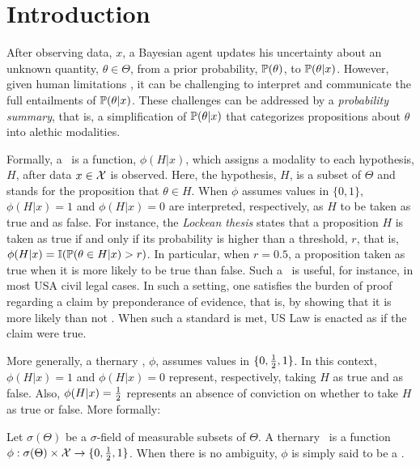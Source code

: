 \section{Introduction}

After observing data, $x$,
a Bayesian agent updates his uncertainty about
an unknown quantity, $\theta \in \Theta$, from
a prior probability, $\P(\theta)$, to
$\P(\theta|x)$. However,
given human limitations \citep{Tversky1974},
it can be challenging to
interpret and communicate
the full entailments of $\P(\theta|x)$.
These challenges can be addressed by
a \textit{probability summary}, that is,
a simplification of $\P(\theta|x)$ that
categorizes propositions about $\theta$ into
alethic modalities. 

Formally, a \probsumm\ is a function,
$\phi(H|x)$, which assigns
a modality to each hypothesis, $H$,
after data $x \in \sX$ is observed.
Here, the hypothesis, $H$, is 
a subset of $\Theta$ and stands for
the proposition that $\theta \in H$.
When $\phi$ assumes values in $\{0,1\}$,
$\phi(H|x) = 1$ and $\phi(H|x) = 0$ 
are interpreted, respectively, as
$H$ to be taken as true and as false.
For instance, the 
\textit{Lockean thesis} \citep{Foley2009}
states that a proposition $H$ is 
taken as true if and only if 
its probability is higher than 
a threshold, $r$, that is,
$\phi(H|x) = \I(\P(\theta \in H|x) > r)$.
In particular, when $r = 0.5$, a proposition 
taken as true when
it is more likely to be true than false.
Such a \summ \ is useful,
for instance, in most USA civil legal cases.
In such a setting, one satisfies
the burden of proof regarding a claim by
preponderance of evidence, that is, by
showing that it is
more likely than not \citep{Carlson2023}.
When such a standard is met,
US Law is enacted as if the claim were true.

More generally, 
a thernary \probsumm, $\phi$,
assumes values in $\{0, \half, 1\}$.
In this context, 
$\phi(H|x) = 1$ and $\phi(H|x) = 0$ represent,
respectively, taking $H$ as true and as false.
Also, $\phi(H|x) = \half$ represents
an absence of conviction on whether 
to take $H$ as true or false.
More formally:

\begin{definition}
 Let $\sigma(\Theta)$ be
 a $\sigma$-field of 
 measurable subsets of $\Theta$.
 A thernary \probsumm\
 is a function
 $\phi: \sigma(\Theta) \times \sX
 \rightarrow \{0, \half, 1\}$.
 When there is no ambiguity,
 $\phi$ is simply said to be
 a \summ.
\end{definition}

